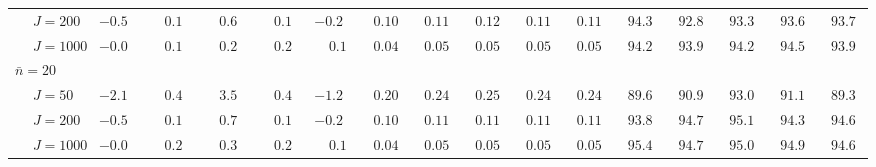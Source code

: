 \begin{sidewaystable}
\begin{threeparttable}
\begin{tabular}{llccccccccccccccc}
 & \nopagebreak $\;J=200$  & ${-}0.5\phantom{0}$ & $\phantom{-}0.1\phantom{0}$ & $\phantom{-}0.6\phantom{0}$ & $\phantom{-}0.1\phantom{0}$ & ${-}0.2\phantom{0}$ & $\phantom{0}0.10\phantom{0}$ & $\phantom{0}0.11\phantom{0}$ & $\phantom{0}0.12\phantom{0}$ & $\phantom{0}0.11\phantom{0}$ & $\phantom{0}0.11\phantom{0}$ & $\phantom{0}94.3\phantom{0}$ & $\phantom{0}92.8\phantom{0}$ & $\phantom{0}93.3\phantom{0}$ & $\phantom{0}93.6\phantom{0}$ & $\phantom{0}93.7\phantom{0}$ \\
 & \nopagebreak $\;J=1000$  & ${-}0.0\phantom{0}$ & $\phantom{-}0.1\phantom{0}$ & $\phantom{-}0.2\phantom{0}$ & $\phantom{-}0.2\phantom{0}$ & $\phantom{-}0.1\phantom{0}$ & $\phantom{0}0.04\phantom{0}$ & $\phantom{0}0.05\phantom{0}$ & $\phantom{0}0.05\phantom{0}$ & $\phantom{0}0.05\phantom{0}$ & $\phantom{0}0.05\phantom{0}$ & $\phantom{0}94.2\phantom{0}$ & $\phantom{0}93.9\phantom{0}$ & $\phantom{0}94.2\phantom{0}$ & $\phantom{0}94.5\phantom{0}$ & $\phantom{0}93.9\phantom{0}$ \\
\multicolumn{4}{l}{$\bar{n}=20$} \\  & \nopagebreak $\;J=50$  & ${-}2.1\phantom{0}$ & $\phantom{-}0.4\phantom{0}$ & $\phantom{-}3.5\phantom{0}$ & $\phantom{-}0.4\phantom{0}$ & ${-}1.2\phantom{0}$ & $\phantom{0}0.20\phantom{0}$ & $\phantom{0}0.24\phantom{0}$ & $\phantom{0}0.25\phantom{0}$ & $\phantom{0}0.24\phantom{0}$ & $\phantom{0}0.24\phantom{0}$ & $\phantom{0}89.6\phantom{0}$ & $\phantom{0}90.9\phantom{0}$ & $\phantom{0}93.0\phantom{0}$ & $\phantom{0}91.1\phantom{0}$ & $\phantom{0}89.3\phantom{0}$ \\
 & \nopagebreak $\;J=200$  & ${-}0.5\phantom{0}$ & $\phantom{-}0.1\phantom{0}$ & $\phantom{-}0.7\phantom{0}$ & $\phantom{-}0.1\phantom{0}$ & ${-}0.2\phantom{0}$ & $\phantom{0}0.10\phantom{0}$ & $\phantom{0}0.11\phantom{0}$ & $\phantom{0}0.11\phantom{0}$ & $\phantom{0}0.11\phantom{0}$ & $\phantom{0}0.11\phantom{0}$ & $\phantom{0}93.8\phantom{0}$ & $\phantom{0}94.7\phantom{0}$ & $\phantom{0}95.1\phantom{0}$ & $\phantom{0}94.3\phantom{0}$ & $\phantom{0}94.6\phantom{0}$ \\
 & \nopagebreak $\;J=1000$  & ${-}0.0\phantom{0}$ & $\phantom{-}0.2\phantom{0}$ & $\phantom{-}0.3\phantom{0}$ & $\phantom{-}0.2\phantom{0}$ & $\phantom{-}0.1\phantom{0}$ & $\phantom{0}0.04\phantom{0}$ & $\phantom{0}0.05\phantom{0}$ & $\phantom{0}0.05\phantom{0}$ & $\phantom{0}0.05\phantom{0}$ & $\phantom{0}0.05\phantom{0}$ & $\phantom{0}95.4\phantom{0}$ & $\phantom{0}94.7\phantom{0}$ & $\phantom{0}95.0\phantom{0}$ & $\phantom{0}94.9\phantom{0}$ & $\phantom{0}94.6\phantom{0}$ \\

\end{tabular}
\end{threeparttable}
\end{sidewaystable}
